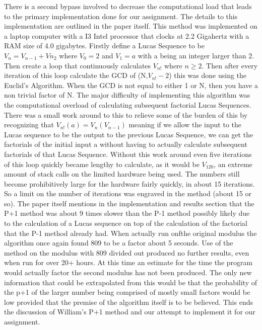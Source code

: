 \documentclass[12pt]{article} %
\begin{document}
	\indent There is a second bypass involved to decrease the computational load that leads to the primary implementation done for our assignment. The details to this implementation are outlined in the paper itself. This method was implemented on a laptop computer with a I3 Intel processor that clocks at 2.2 Gigahertz with a RAM size of 4.0 gigabytes. Firstly define a Lucas Sequence to be $V_n = V_{n-1}+V{n_2}$ where $V_0 = 2$ and $V_1 = a$ with a being an integer larger than 2. Then create a loop that continuously calculates $V_{n!}$ where $n \geq 2$. Then after every iteration of this loop calculate the GCD of (N,$V_{n!}-2$) this was done using the Euclid's Algorithm. When the GCD is not equal to either 1 or N, then you have a non trivial factor of N. The major difficulty of implementing this algorithm was the computational overload of calculating subsequent factorial Lucas Sequences. There was a small work around to this to relieve some of the burden of this by recognizing that $V_{n!}(a) = V_n({V_{n-1}})$ meaning if we allow the input to the Lucas sequence to be the output to the previous Lucas Sequence, we can get the factorials of the initial input a without having to actually calculate subsequent factorials of that Lucas Sequence. Without this work around even five iterations of this loop quickly became lengthy to calculate, as it would be $V_120$, an extreme amount of stack calls on the limited hardware being used. The numbers still become prohibitively large for the hardware fairly quickly, in about 15 iterations. So a limit on the number of iterations was engraved in the method (about 15 or so). The paper itself mentions in the implementation and results section that the P+1 method was about 9 times slower than the P-1 method possibly likely due to the calculation of a Lucas sequence on top of the calculation of the factorial that the P-1 method already had. When actually run onfthe original modulus the algorithm once again found 809 to be a factor about 5 seconds. Use of the method on the modulus with 809 divided out produced no further results, even when run for over 20+ hours. At this time an estimate for the time the program would actually factor the second modulus has not been produced. The only new information that could be extrapolated from this would be that the probability of the p+1 of the larger number being comprised of mostly small factors would be low provided that the premise of the algorithm itself is to be believed. This ends the discussion of William's P+1 method and our attempt to implement it for our assignment. 
	
\end{document}
